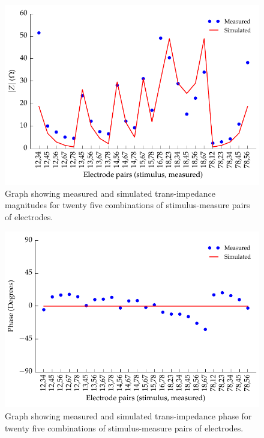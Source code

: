     \begin{figure}
      \centering
      \includegraphics{content/pt2/08-InterfaceParameters/graphics/sheep_transimpedance_doubleFit_mag_thesis}
      \caption{\label{fig:sheep_transimpedance_doubleFit_mag} Graph showing measured and simulated trans-impedance magnitudes for twenty five combinations of stimulus-measure pairs of electrodes.}
    \end{figure}

    \begin{figure}
      \centering
      \includegraphics{content/pt2/08-InterfaceParameters/graphics/sheep_transimpedance_doubleFit_phase_thesis}
      \caption{\label{fig:sheep_transimpedance_doubleFit_phase} Graph showing measured and simulated trans-impedance phase for twenty five combinations of stimulus-measure pairs of electrodes.}
    \end{figure}

